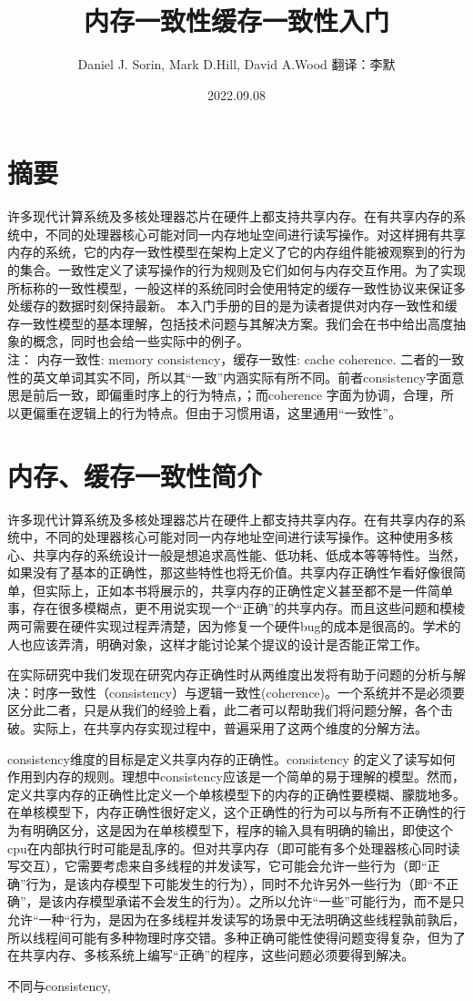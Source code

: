 \documentclass[UTF-8]{ctexbook}
\begin{document}
\title{内存一致性缓存一致性入门}
\author{Daniel J. Sorin, Mark D.Hill, David A.Wood 翻译：李默}
\date{2022.09.08}
\maketitle
\tableofcontents
\chapter*{摘要}
许多现代计算系统及多核处理器芯片在硬件上都支持共享内存。在有共享内存的系统中，不同的处理器核心可能对同一内存地址空间进行读写操作。对这样拥有共享内存的系统，它的内存一致性模型在架构上定义了它的内存组件能被观察到的行为的集合。一致性定义了读写操作的行为规则及它们如何与内存交互作用。为了实现所标称的一致性模型，一般这样的系统同时会使用特定的缓存一致性协议来保证多处缓存的数据时刻保持最新。 本入门手册的目的是为读者提供对内存一致性和缓存一致性模型的基本理解，包括技术问题与其解决方案。我们会在书中给出高度抽象的概念，同时也会给一些实际中的例子。
\\注： 内存一致性:  memory consistency，缓存一致性:  cache coherence. 二者的一致性的英文单词其实不同，所以其“一致”内涵实际有所不同。前者consistency字面意思是前后一致，即偏重时序上的行为特点，；而coherence 字面为协调，合理，所以更偏重在逻辑上的行为特点。但由于习惯用语，这里通用“一致性”。
\chapter{内存、缓存一致性简介}
许多现代计算系统及多核处理器芯片在硬件上都支持共享内存。在有共享内存的系统中，不同的处理器核心可能对同一内存地址空间进行读写操作。这种使用多核心、共享内存的系统设计一般是想追求高性能、低功耗、低成本等等特性。当然，如果没有了基本的正确性，那这些特性也将无价值。共享内存正确性乍看好像很简单，但实际上，正如本书将展示的，共享内存的正确性定义甚至都不是一件简单事，存在很多模糊点，更不用说实现一个“正确”的共享内存。而且这些问题和模棱两可需要在硬件实现过程弄清楚，因为修复一个硬件bug的成本是很高的。学术的人也应该弄清，明确对象，这样才能讨论某个提议的设计是否能正常工作。
\par 在实际研究中我们发现在研究内存正确性时从两维度出发将有助于问题的分析与解决：时序一致性（consistency）与逻辑一致性(coherence)。一个系统并不是必须要区分此二者，只是从我们的经验上看，此二者可以帮助我们将问题分解，各个击破。实际上，在共享内存实现过程中，普遍采用了这两个维度的分解方法。
\par consistency维度的目标是定义共享内存的正确性。consistency 的定义了读写如何作用到内存的规则。理想中consistency应该是一个简单的易于理解的模型。然而，定义共享内存的正确性比定义一个单核模型下的内存的正确性要模糊、朦胧地多。在单核模型下，内存正确性很好定义，这个正确性的行为可以与所有不正确性的行为有明确区分，这是因为在单核模型下，程序的输入具有明确的输出，即使这个cpu在内部执行时可能是乱序的。但对共享内存（即可能有多个处理器核心同时读写交互），它需要考虑来自多线程的并发读写，它可能会允许一些行为（即“正确”行为，是该内存模型下可能发生的行为），同时不允许另外一些行为（即“不正确”，是该内存模型承诺不会发生的行为）。之所以允许“一些”可能行为，而不是只允许“一种“行为，是因为在多线程并发读写的场景中无法明确这些线程孰前孰后，所以线程间可能有多种物理时序交错。多种正确可能性使得问题变得复杂，但为了在共享内存、多核系统上编写“正确”的程序，这些问题必须要得到解决。
\par 不同与consistency, 
\end{document}
